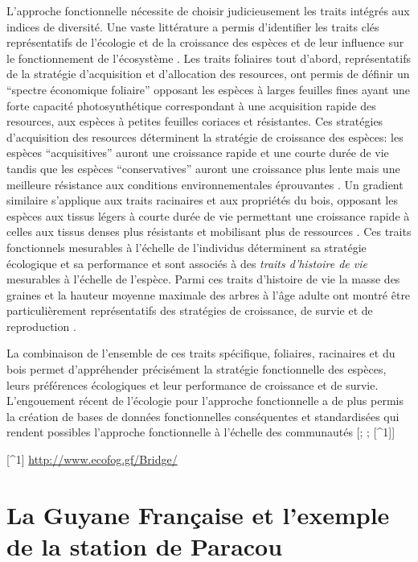 \documentclass[
  11pt,
  french,
  A4paper,
  extrafontsizes,onecolumn,openright
  ]{memoir}
\begin{document}
L'approche fonctionnelle nécessite de choisir judicieusement les traits
intégrés aux indices de diversité. Une vaste littérature a permis
d'identifier les traits clés représentatifs de l'écologie et de la
croissance des espèces et de leur influence sur le fonctionnement de
l'écosystème \autocite{Reich2014}. Les traits foliaires tout d'abord,
représentatifs de la stratégie d'acquisition et d'allocation des
resources, ont permis de définir un ``spectre économique foliaire''
opposant les espèces à larges feuilles fines ayant une forte capacité
photosynthétique correspondant à une acquisition rapide des resources,
aux espèces à petites feuilles coriaces et résistantes. Ces stratégies
d'acquisition des resources déterminent la stratégie de croissance des
espèces: les espèces ``acquisitives'' auront une croissance rapide et
une courte durée de vie tandis que les espèces ``conservatives'' auront
une croissance plus lente mais une meilleure résistance aux conditions
environnementales éprouvantes \autocites{Reich1997}{Wright2004}. Un
gradient similaire s'applique aux traits racinaires et aux propriétés du
bois, opposant les espèces aux tissus légers à courte durée de vie
permettant une croissance rapide à celles aux tissus denses plus
résistants et mobilisant plus de ressources
\autocites{Chave2009}{Valverde-Barrantes2017}. Ces traits fonctionnels
mesurables à l'échelle de l'individus déterminent sa stratégie
écologique et sa performance et sont associés à des \emph{traits
d'histoire de vie} mesurables à l'échelle de l'espèce. Parmi ces traits
d'histoire de vie la masse des graines et la hauteur moyenne maximale
des arbres à l'âge adulte ont montré être particulièrement
représentatifs des stratégies de croissance, de survie et de
reproduction \autocites{Westoby1998}{Herault2011}.

La combinaison de l'ensemble de ces traits spécifique, foliaires,
racinaires et du bois permet d'appréhender précisément la stratégie
fonctionnelle des espèces, leurs préférences écologiques et leur
performance de croissance et de survie. L'engouement récent de
l'écologie pour l'approche fonctionnelle a de plus permis la création de
bases de données fonctionnelles conséquentes et standardisées qui
rendent possibles l'approche fonctionnelle à l'échelle des communautés
{[}\textcite{Kattge2011}; \textcite{Perez-Harguindeguy2013};
{[}\^{}1{]}{]}

{[}\^{}1{]} \url{http://www.ecofog.gf/Bridge/}

\section{La Guyane Française et l'exemple de la station de
Paracou}\label{la-guyane-francaise-et-lexemple-de-la-station-de-paracou}
\end{document}
